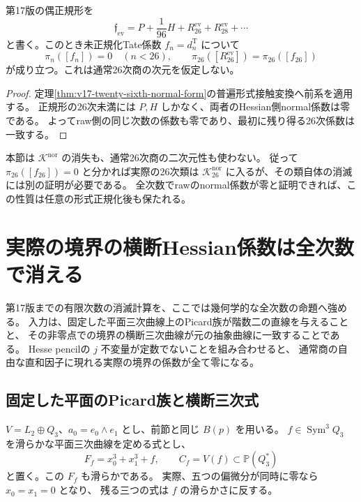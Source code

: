 \begin{corollary}[二十六次の実際のnormal係数]
\label{cor:v18-actual26-normal-equals-raw}
第17版の偶正規形を
\[
 \mathfrak f_{\mathrm{ev}}=P+\frac1{96}H+
          R_{26}^{\mathrm{ev}}+R_{28}^{\mathrm{ev}}+\cdots
\]
と書く。このとき未正規化Tate係数 $f_n=d_n^{\mathrm T}$ について
\[
 \pi_n([f_n])=0\quad(n<26),\qquad
 \pi_{26}([R_{26}^{\mathrm{ev}}])=\pi_{26}([f_{26}])
\]
が成り立つ。これは通常26次商の次元を仮定しない。
\end{corollary}

\begin{proof}
定理\ref{thm:v17-twenty-sixth-normal-form}の普遍形式接触変換へ前系を適用する。
正規形の26次未満には $P,H$ しかなく、両者のHessian側normal係数は零である。
よってraw側の同じ次数の係数も零であり、最初に残り得る26次係数は一致する。
\end{proof}

\begin{remark}[通常像への所属と区別する]
本節は $\mathcal K^{\mathrm{nor}}$ の消失も、通常26次商の二次元性も使わない。
従って $\pi_{26}([f_{26}])=0$ と分かれば実際の26次類は
$\mathcal K_{26}^{\mathrm{nor}}$ に入るが、その類自体の消滅には別の証明が必要である。
全次数でrawのnormal係数が零と証明できれば、この性質は任意の形式正規化後も保たれる。
\end{remark}



\section{実際の境界の横断Hessian係数は全次数で消える}
\label{sec:v18-actual-normal-vanishing}

第17版までの有限次数の消滅計算を、ここでは幾何学的な全次数の命題へ強める。
入力は、固定した平面三次曲線上のPicard族が階数二の直線を与えることと、
その非零点での境界の横断三次曲線が元の抽象曲線に一致することである。
Hesse pencilの $j$ 不変量が定数でないことを組み合わせると、
通常商の自由な直和因子に現れる実際の境界の係数が全て零になる。

\subsection{固定した平面のPicard族と横断三次式}

$V=L_2\oplus Q_3$、$a_0=e_0\wedge e_1$ とし、前節と同じ $B(p)$ を用いる。
$f\in\operatorname{Sym}^3Q_3$ を滑らかな平面三次曲線を定める式とし、
\[
 F_f=x_0^3+x_1^3+f,\qquad C_f=V(f)\subset\mathbb P(Q_3^*)
\]
と置く。この $F_f$ も滑らかである。
実際、五つの偏微分が同時に零なら $x_0=x_1=0$ となり、
残る三つの式は $f$ の滑らかさに反する。

